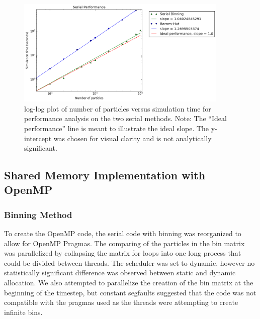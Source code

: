 \documentclass{article}
\begin{document}
%
\begin{figure}[ht!]
\centering
\includegraphics[width=0.9\textwidth]{serial.png}
\caption[Serial complexity plot]{log-log plot of number of particles versus
  simulation time for performance analysis on the two serial methods. Note: The
  ``Ideal performance'' line is meant to illustrate the ideal slope. The
  y-intercept was chosen for visual clarity and is not analytically
  significant.}\label{fig:serial}
\end{figure}
%

\subsection{Shared Memory Implementation with OpenMP}
\label{subsection:openmp}
\subsubsection{Binning Method}
To create the OpenMP code, the serial code with binning was reorganized to allow
for OpenMP Pragmas. The comparing of the particles in the bin matrix was
parallelized by collapsing the matrix for loops into one long process that could
be divided between threads. The scheduler was set to dynamic, however no
statistically significant difference was observed between static and dynamic
allocation. We also attempted to parallelize the creation of the bin matrix at
the beginning of the timestep, but constant segfaults suggested that the code
was not compatible with the pragmas used as the threads were attempting to
create infinite bins.
\end{document}

